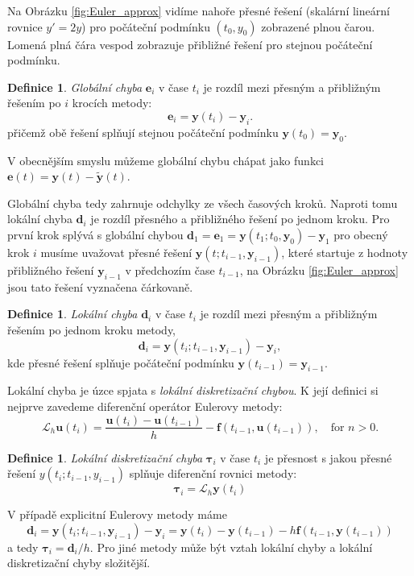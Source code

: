 \documentclass[a4paper, 12pt]{book}
\theoremstyle{definition}
\newtheorem{definition}[theorem]{Definice}
\def\vc#1{\mathbf{\boldsymbol{#1}}}     %
\def\df#1{\emph{#1}}
\begin{document}
Na Obrázku \ref{fig:Euler_approx} vidíme nahoře přesné řešení (skalární lineární rovnice $y'=2y$) pro počáteční podmínku $(t_0, y_0)$ zobrazené plnou čarou.
Lomená plná čára vespod zobrazuje přibližné řešení pro stejnou počáteční podmínku. 

\begin{definition}
 \df{Globální chyba} $\vc e_i$ v čase $t_i$ je rozdíl mezi přesným a přibližným řešením po $i$ krocích metody:
 \[
    \vc e_i = \vc y(t_i) - \vc y_i.
 \]
 přičemž obě řešení splňují stejnou počáteční podmínku $\vc y(t_0)=\vc y_0$.
\end{definition}
V obecnějším smyslu můžeme globální chybu chápat jako funkci $\vc e(t) = \vc y(t) - \vc{\tilde y}(t)$.

Globální chyba tedy zahrnuje odchylky ze všech časových kroků.
Naproti tomu lokální chyba $\vc d_i$ je rozdíl přesného a přibližného řešení po jednom kroku. Pro první krok splývá s globální chybou 
$\vc d_1=\vc e_1=\vc y(t_1; t_0, \vc y_0) - \vc y_1$ pro obecný krok $i$ musíme uvažovat přesné řešení $\vc y(t; t_{i-1}, \vc y_{i-1})$,
které startuje 
z hodnoty přibližného řešení $\vc y_{i-1}$ v předchozím čase $t_{i-1}$, na Obrázku \ref{fig:Euler_approx} jsou tato řešení vyznačena čárkovaně.

\begin{definition}
 \df{Lokální chyba} $\vc d_i$ v čase $t_i$ je rozdíl mezi přesným a přibližným řešením po jednom kroku metody,
 \[
   \vc d_i = \vc y(t_i; t_{i-1}, \vc y_{i-1}) - \vc y_i,
 \]
kde přesné řešení splňuje počáteční podmínku $\vc y(t_{i-1}) = \vc y_{i-1}$. 
\end{definition}

Lokální chyba je úzce spjata s \df{lokální diskretizační chybou}. K její definici si nejprve zavedeme diferenční operátor Eulerovy metody:
\[
 \mathcal{L}_h \vc u(t_i) = \frac{\vc u(t_i) - \vc u(t_{i-1})}{h} - \vc f(t_{i-1}, \vc u(t_{i-1})), \quad \text{for }n>0.
\]
\begin{definition}
 \df{Lokální diskretizační chyba} $\vc{\tau}_i$ v čase $t_i$ je přesnost s jakou přesné řešení 
 $y(t_i; t_{i-1}, y_{i-1})$ splňuje diferenční rovnici metody:
 \[
   \vc{\tau}_i = \mathcal{L}_h \vc y(t_i)
 \]
\end{definition}

V případě explicitní Eulerovy metody máme
\[
  \vc d_i = \vc y(t_i; t_{i-1}, \vc y_{i-1}) - \vc y_i = \vc y(t_i) - \vc y(t_{i-1}) - h \vc f(t_{i-1}, \vc y(t_{i-1}))
\]
a tedy $\vc \tau_i = \vc d_i/h$. Pro jiné metody může být vztah lokální chyby a lokální diskretizační chyby složitější.
\end{document}

